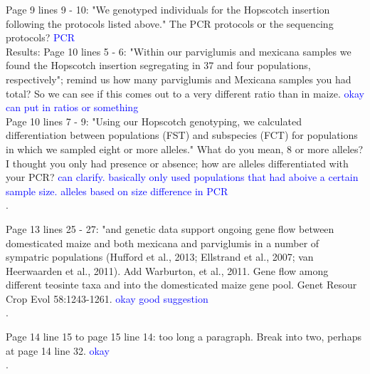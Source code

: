 \documentclass[11pt]{article}
\newcommand{\res}[1]{\noindent \textcolor{blue}{{#1}} \\}
\begin{document}
Page 9 lines 9 - 10: "We genotyped individuals for the Hopscotch insertion following the protocols listed above." The PCR protocols or the sequencing protocols? \res{PCR}

Results:
Page 10 lines 5 - 6: "Within our parviglumis and mexicana samples we found the Hopscotch insertion segregating in 37 and four populations, respectively"; remind us how many parviglumis and Mexicana samples you had total? So we can see if this comes out to a very different ratio than in maize. \res{okay can put in ratios or something}

Page 10 lines 7 - 9: "Using our Hopscotch genotyping, we calculated diﬀerentiation between populations (FST) and subspecies (FCT) for populations in which we sampled eight or more alleles." What do you mean, 8 or more alleles? I thought you only had presence or absence; how are alleles differentiated with your PCR? \res{can clarify. basically only used populations that had aboive a certain sample size. alleles based on size difference in PCR}. 

Page 13 lines 25 - 27: "and genetic data support ongoing gene ﬂow between domesticated maize and both mexicana and parviglumis in a number of sympatric populations (Huﬀord et al., 2013; Ellstrand et al., 2007; van Heerwaarden et al., 2011). Add Warburton, et al., 2011.  Gene flow among different teosinte taxa and into the domesticated maize gene pool.  Genet Resour Crop Evol 58:1243-1261. \res{okay good suggestion}. 

Page 14 line 15 to page 15 line 14: too long a paragraph. Break into two, perhaps at page 14 line 32. \res{okay}. 
\end{document}

